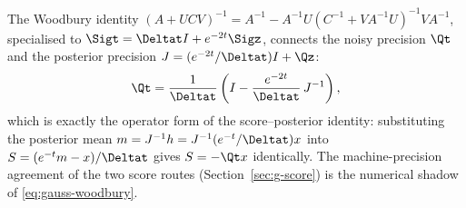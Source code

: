 The Woodbury identity
$(A + UCV)^{-1} = A^{-1} - A^{-1}U (C^{-1} + V A^{-1} U)^{-1} V A^{-1}$,
specialised to $\Sigt = \Deltat I + e^{-2t} \Sigz$, connects the noisy
precision $\Qt$ and the posterior precision
$J = (e^{-2t}/\Deltat) I + \Qz$:
\begin{equation}
  \Qt
  = \frac{1}{\Deltat}
    \left( I - \frac{e^{-2t}}{\Deltat}\, J^{-1} \right),
  \label{eq:gauss-woodbury}
\end{equation}
which is exactly the operator form of the score--posterior identity: substituting the
posterior mean $m = J^{-1} h = J^{-1} (e^{-t}/\Deltat) x$ into
$S = (e^{-t} m - x)/\Deltat$ gives $S = -\Qt x$ identically. The
machine-precision agreement of the two score routes
(Section~\ref{sec:g-score}) is the numerical shadow of
\eqref{eq:gauss-woodbury}.
